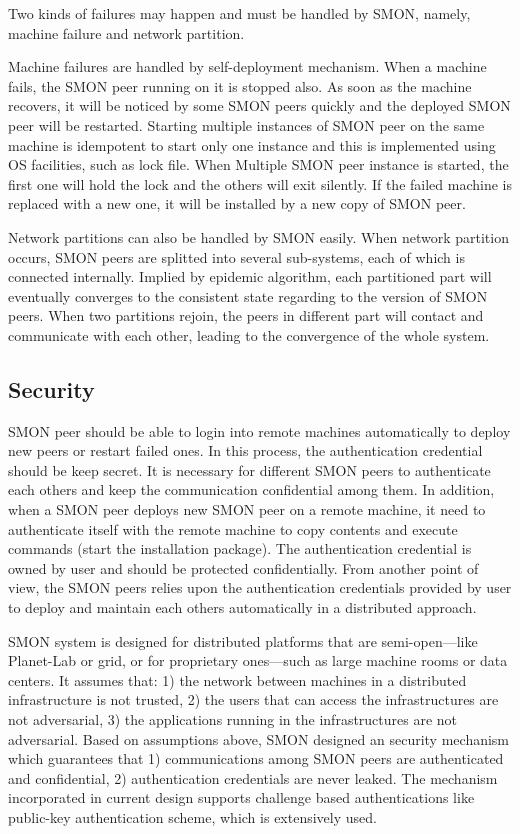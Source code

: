 Two kinds of failures may happen and must be handled by
SMON, namely, machine failure and network partition.

Machine failures are handled by self-deployment mechanism.
When a machine fails, the SMON peer running on it is stopped
also.  As soon as the machine recovers, it will be noticed
by some SMON peers quickly and the deployed SMON peer will
be restarted. Starting multiple instances of SMON peer on
the same machine is idempotent to start only one instance
and this is implemented using OS facilities, such as lock
file. When Multiple SMON peer instance is started, the first
one will hold the lock and the others will exit silently.
If the failed machine is replaced with a new one, it will be
installed by a new copy of SMON peer.

Network partitions can also be handled by SMON easily. When
network partition occurs, SMON peers are splitted into
several sub-systems, each of which is connected internally.
Implied by epidemic algorithm, each partitioned part will
eventually converges to the consistent state regarding to
the version of SMON peers. When two partitions rejoin, the
peers in different part will contact and communicate with
each other, leading to the convergence of the whole system.

\subsection{Security}
\label{subsec:security}

SMON peer should be able to login into remote machines
automatically to deploy new peers or restart failed ones.
In this process, the authentication credential should be
keep secret.   It is necessary for different
SMON peers to authenticate each others and keep the
communication confidential among them. In addition, when a
SMON peer deploys new SMON peer on a remote machine, it need
to authenticate itself with the remote machine to copy
contents and execute commands (start the installation
package). The authentication credential is owned by user and
should be protected confidentially. From another point of
view, the SMON peers relies upon the authentication
credentials provided by user to deploy and maintain each
others automatically in a distributed approach. 

SMON system is designed for distributed platforms that are
semi-open---like Planet-Lab or grid, or for proprietary
ones---such as large machine rooms or data centers. It
assumes that: 1) the network between machines in a
distributed infrastructure is not trusted, 2) the users that
can access the infrastructures are not adversarial, 3) the
applications running in the infrastructures are not
adversarial. Based on assumptions above, SMON designed an
security mechanism which guarantees that 1) communications
among SMON peers are authenticated and confidential, 2)
authentication credentials are never leaked. The mechanism
incorporated in current design supports challenge based
authentications like public-key authentication scheme, which
is extensively used.


